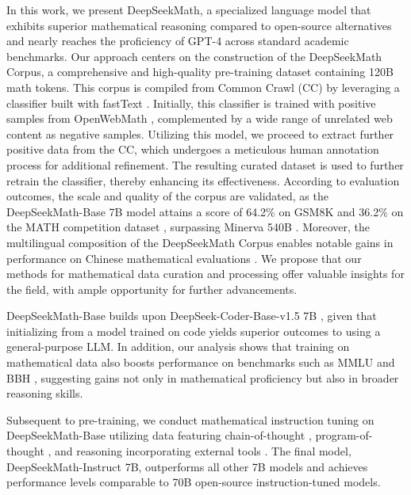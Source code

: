 In this work, we present DeepSeekMath, a specialized language model that exhibits superior mathematical reasoning compared to open-source alternatives and nearly reaches the proficiency of GPT-4 across standard academic benchmarks. Our approach centers on the construction of the DeepSeekMath Corpus, a comprehensive and high-quality pre-training dataset containing 120B math tokens. This corpus is compiled from Common Crawl (CC) by leveraging a classifier built with fastText \citep{joulin2016fasttext}. Initially, this classifier is trained with positive samples from OpenWebMath \citep{openwebmath}, complemented by a wide range of unrelated web content as negative samples. Utilizing this model, we proceed to extract further positive data from the CC, which undergoes a meticulous human annotation process for additional refinement. The resulting curated dataset is used to further retrain the classifier, thereby enhancing its effectiveness. According to evaluation outcomes, the scale and quality of the corpus are validated, as the DeepSeekMath-Base 7B model attains a score of 64.2\% on GSM8K \citep{gsm8k} and 36.2\% on the MATH competition dataset \citep{MATH}, surpassing Minerva 540B \citep{minerva}. Moreover, the multilingual composition of the DeepSeekMath Corpus enables notable gains in performance on Chinese mathematical evaluations \citep{wei2023cmath,agieval}. We propose that our methods for mathematical data curation and processing offer valuable insights for the field, with ample opportunity for further advancements.

DeepSeekMath-Base builds upon DeepSeek-Coder-Base-v1.5 7B \citep{deepseek-coder}, given that initializing from a model trained on code yields superior outcomes to using a general-purpose LLM. In addition, our analysis shows that training on mathematical data also boosts performance on benchmarks such as MMLU \citep{mmlu} and BBH \citep{bbh}, suggesting gains not only in mathematical proficiency but also in broader reasoning skills.

Subsequent to pre-training, we conduct mathematical instruction tuning on DeepSeekMath-Base utilizing data featuring chain-of-thought \citep{cot}, program-of-thought \citep{pot,pal}, and reasoning incorporating external tools \citep{tora}. The final model, DeepSeekMath-Instruct 7B, outperforms all other 7B models and achieves performance levels comparable to 70B open-source instruction-tuned models.

